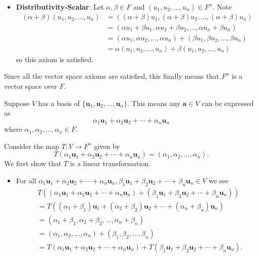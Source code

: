 \begin{questions}
\begin{itemize}
        \item \textbf{Distributivity-Scalar}: Let $\alpha, \beta \in F$ and $(u_1, u_2, \dots, u_n) \in F^n$. Note
        \begin{align*}
            (\alpha+\beta)(u_1, u_2, \dots, u_n) &= ((\alpha+\beta)u_1, (\alpha+\beta)u_2, \dots, (\alpha+\beta)u_n)\\
            &= (\alpha u_1 + \beta u_1, \alpha u_2 + \beta u_2, \dots, \alpha u_n + \beta u_n)\\
            &= (\alpha u_1, \alpha u_2, \dots, \alpha u_n) + (\beta u_1, \beta u_2, \dots, \beta u_n)\\
            &= \alpha(u_1, u_2, \dots, u_n) + \beta(u_1, u_2, \dots, u_n)
        \end{align*}
        so this axiom is satisfied.
    \end{itemize}
    Since all the vector space axioms are satisfied, this finally means that $F^n$ is a vector space over $F$.
    
    \item Suppose $V$ has a basis of $\{\textbf{u}_1, \textbf{u}_2, \dots, \textbf{u}_n\}$. This means any $\textbf{a} \in V$ can be expressed as
    \[
        \alpha_1\textbf{u}_1 + \alpha_2\textbf{u}_2 + \cdots + \alpha_n\textbf{u}_n
    \]
    where $\alpha_1,\alpha_2,\dots,\alpha_n \in F$.

    Consider the map $T: V \to F^n$ given by
    \[
        T( \alpha_1\textbf{u}_1 + \alpha_2\textbf{u}_2 + \cdots + \alpha_n\textbf{u}_n) = (\alpha_1, \alpha_2, \dots, \alpha_n).
    \]
    We first show that $T$ is a linear transformation.
    \begin{itemize}
        \item For all $\alpha_1\textbf{u}_1 + \alpha_2\textbf{u}_2 + \cdots + \alpha_n\textbf{u}_n, \beta_1\textbf{u}_1 + \beta_2\textbf{u}_2 + \cdots + \beta_n\textbf{u}_n \in V$ we see
        \begin{align*}
            &T((\alpha_1\textbf{u}_1 + \alpha_2\textbf{u}_2 + \cdots + \alpha_n\textbf{u}_n) + (\beta_1\textbf{u}_1 + \beta_2\textbf{u}_2 + \cdots + \beta_n\textbf{u}_n))\\
            &= T((\alpha_1 + \beta_1)\textbf{u}_1 + (\alpha_2 + \beta_2)\textbf{u}_2 + \cdots + (\alpha_n + \beta_n)\textbf{u}_n)\\
            &= (\alpha_1 + \beta_1, \alpha_2 + \beta_2, \dots, \alpha_n + \beta_n)\\
            &= (\alpha_1, \alpha_2, \dots, \alpha_n) + (\beta_1, \beta_2, \dots, \beta_n)\\
            &= T(\alpha_1\textbf{u}_1 + \alpha_2\textbf{u}_2 + \cdots + \alpha_n\textbf{u}_n) + T(\beta_1\textbf{u}_1 + \beta_2\textbf{u}_2 + \cdots + \beta_n\textbf{u}_n).
        \end{align*}


\end{itemize}
\end{questions}
